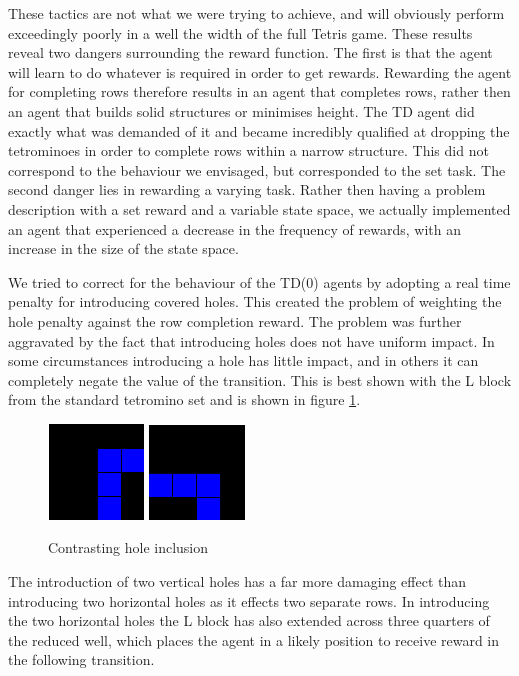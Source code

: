 \documentclass{rucsthesis}
\begin{document}
These tactics are not what we were trying to achieve, and will obviously perform exceedingly poorly in a well the width of the full Tetris game. These results reveal two dangers surrounding the reward function. The first is that the agent will learn to do whatever is required in order to get rewards. Rewarding the agent for completing rows therefore results in an agent that completes rows, rather then an agent that builds solid structures or minimises height. The TD agent did exactly what was demanded of it and became incredibly qualified at dropping the tetrominoes in order to complete rows within a narrow structure. This did not correspond to the behaviour we envisaged, but corresponded to the set task.  The second danger lies in rewarding a varying task. Rather then having a problem description with a set reward and a variable state space, we actually implemented an agent that experienced a decrease in the frequency of rewards, with an increase in the size of the state space. 

We tried to correct for the behaviour of the TD(0) agents by adopting a real time penalty for introducing covered holes. This created the problem of weighting the hole penalty against the row completion reward. The problem was further aggravated by the fact that introducing holes does not have uniform impact. In some circumstances introducing a hole has little impact, and in others it can completely negate the value of the transition. This is best shown with the L block from the standard tetromino set and is shown in figure \ref{fig:diffholes}. 

\begin{figure}[h]
\centering
\includegraphics[width=1in]{worthless.png}
\includegraphics[width=1in]{notworthless.png}
\caption{Contrasting hole inclusion}
\label{fig:diffholes}
\end{figure}

The introduction of two vertical holes has a far more damaging effect than introducing two horizontal holes as it effects two separate rows. In introducing the two horizontal holes the L block has also extended across three quarters of the reduced well, which places the agent in a likely position to receive reward in the following transition.
\end{document}
